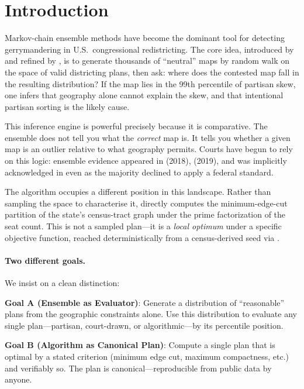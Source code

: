 \section{Introduction}
\label{sec:intro}

Markov-chain ensemble methods have become the dominant tool for detecting
gerrymandering in U.S.\ congressional redistricting.  The core idea,
introduced by \citet{chikina2017assessing} and refined by \citet{deford2021recombination},
is to generate thousands of ``neutral'' maps by random walk on the space of
valid districting plans, then ask: where does the contested map fall in the
resulting distribution?  If the map lies in the 99th percentile of partisan
skew, one infers that geography alone cannot explain the skew, and that
intentional partisan sorting is the likely cause.

This inference engine is powerful precisely because it is comparative.
The ensemble does not tell you what the \emph{correct} map is.  It tells you
whether a given map is an outlier relative to what geography permits.  Courts
have begun to rely on this logic: ensemble evidence appeared in  (2018),
 (2019), and was implicitly acknowledged in
\rucho{} even as the majority declined to apply a federal standard.

The \ar{} algorithm occupies a different position in this landscape.
Rather than sampling the space to characterise it, \ar{} directly computes
the minimum-edge-cut partition of the state's census-tract graph under the
prime factorization of the seat count.  This is not a sampled plan---it is
a \emph{local optimum} under a specific objective function, reached
deterministically from a census-derived seed via \cs{} \citep{dellaLibera2026b16}.

\paragraph{Two different goals.}
We insist on a clean distinction:

\begin{keybox}
\textbf{Goal A (Ensemble as Evaluator)}: Generate a distribution of
``reasonable'' plans from the geographic constraints alone.  Use this
distribution to evaluate any single plan---partisan, court-drawn, or
algorithmic---by its percentile position.

\textbf{Goal B (Algorithm as Canonical Plan)}: Compute a single plan that is
optimal by a stated criterion (minimum edge cut, maximum compactness, etc.)
and verifiably so.  The plan is canonical---reproducible from public data
by anyone.
\end{keybox}

